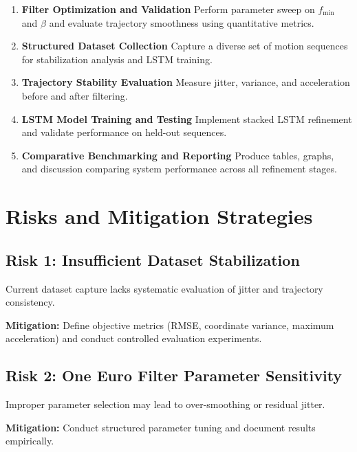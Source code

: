 \begin{enumerate}
    \item \textbf{Filter Optimization and Validation}  
          Perform parameter sweep on $f_{\text{min}}$ and $\beta$ and evaluate 
          trajectory smoothness using quantitative metrics.
    
    \item \textbf{Structured Dataset Collection}  
          Capture a diverse set of motion sequences for stabilization analysis 
          and LSTM training.
    
    \item \textbf{Trajectory Stability Evaluation}  
          Measure jitter, variance, and acceleration before and after filtering.
    
    \item \textbf{LSTM Model Training and Testing}  
          Implement stacked LSTM refinement and validate performance on 
          held-out sequences.
    
    \item \textbf{Comparative Benchmarking and Reporting}  
          Produce tables, graphs, and discussion comparing system performance 
          across all refinement stages.
\end{enumerate}

\section{Risks and Mitigation Strategies}

\subsection*{Risk 1: Insufficient Dataset Stabilization}

Current dataset capture lacks systematic evaluation of jitter and 
trajectory consistency.

\textbf{Mitigation:}  
Define objective metrics (RMSE, coordinate variance, maximum acceleration) 
and conduct controlled evaluation experiments.

\subsection*{Risk 2: One Euro Filter Parameter Sensitivity}

Improper parameter selection may lead to over-smoothing or residual jitter.

\textbf{Mitigation:}  
Conduct structured parameter tuning and document results empirically.

